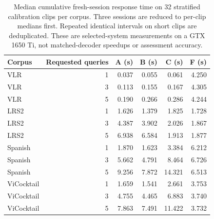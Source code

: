 \begin{table}[tb]
\centering\small
\caption{Median cumulative fresh-session response time on 32 stratified calibration clips per corpus. Three sessions are reduced to per-clip medians first. Repeated identical intervals on short clips are deduplicated. These are selected-system measurements on a GTX 1650 Ti, not matched-decoder speedups or assessment accuracy.}
\label{tab:query-cost}
\begin{tabular}{lrrrrr}
\toprule
Corpus & Requested queries & A (s) & B (s) & C (s) & F (s) \\
\midrule
VLR & 1 & 0.037 & 0.055 & 0.061 & 4.250 \\
VLR & 3 & 0.113 & 0.155 & 0.167 & 4.305 \\
VLR & 5 & 0.190 & 0.266 & 0.286 & 4.244 \\
LRS2 & 1 & 1.626 & 1.379 & 1.825 & 1.728 \\
LRS2 & 3 & 4.387 & 3.902 & 2.026 & 1.867 \\
LRS2 & 5 & 6.938 & 6.584 & 1.913 & 1.877 \\
Spanish & 1 & 1.870 & 1.623 & 3.384 & 6.212 \\
Spanish & 3 & 5.662 & 4.791 & 8.464 & 6.726 \\
Spanish & 5 & 9.256 & 7.872 & 14.321 & 6.513 \\
ViCocktail & 1 & 1.659 & 1.541 & 2.661 & 3.753 \\
ViCocktail & 3 & 4.755 & 4.465 & 6.883 & 3.740 \\
ViCocktail & 5 & 7.863 & 7.491 & 11.422 & 3.732 \\
\bottomrule
\end{tabular}
\end{table}
